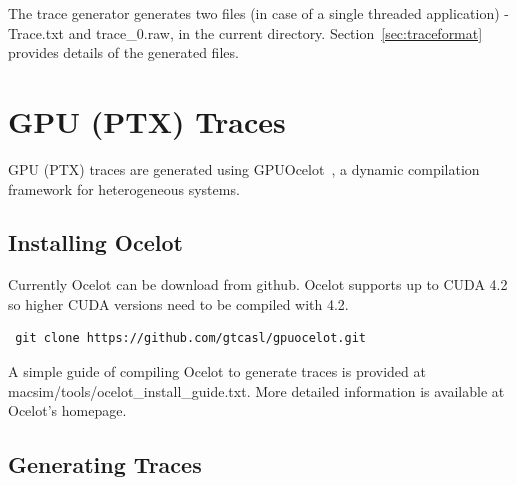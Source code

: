 The trace generator generates two files (in case of a single threaded
application) - Trace.txt and trace\_0.raw, in the current directory.
Section~\ref{sec:traceformat} provides details of the generated files.



\section{GPU (PTX) Traces}
\label{sec:gpu_traces}

GPU (PTX) traces are generated using GPUOcelot~\cite{ocelot}, a dynamic compilation
framework for heterogeneous systems. 


\subsection{Installing Ocelot}

Currently Ocelot can be download from github. Ocelot supports up to
CUDA 4.2 so higher CUDA versions need to be compiled with 4.2. 

\begin{Verbatim}
 git clone https://github.com/gtcasl/gpuocelot.git
\end{Verbatim}

A simple guide of compiling Ocelot to generate traces is provided 
at macsim/tools/ocelot_install_guide.txt. 
More detailed information is available at Ocelot's homepage. 



\subsection{Generating Traces}


